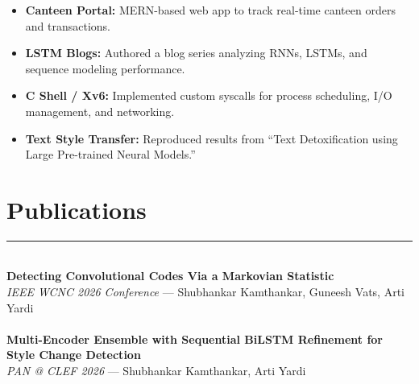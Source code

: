 \documentclass[]{rahulworld-resume}
\begin{document}
\begin{minipage}[t]{0.64\textwidth}
 
\noindent
\hspace{5em}%
\begin{minipage}{0.85\textwidth\vspace{5pt}}
\begin{itemize}
  \item \textbf{Canteen Portal:} MERN-based web app to track real-time canteen orders and transactions.
  \item \textbf{LSTM Blogs:} Authored a blog series analyzing RNNs, LSTMs, and sequence modeling performance.
  \item \textbf{C Shell / Xv6:} Implemented custom syscalls for process scheduling, I/O management, and networking.
  \item \textbf{Text Style Transfer:} Reproduced results from ``Text Detoxification using Large Pre-trained Neural Models.''
\end{itemize}
\end{minipage}

\section{Publications}
\noindent\rule{12.5cm}{0.4pt}

\\
\textbf{Detecting Convolutional Codes Via a Markovian Statistic}\\
\textit{IEEE WCNC 2026 Conference} — Shubhankar Kamthankar, Guneesh Vats, Arti Yardi\\

\vspace{4pt}
\\
\textbf{Multi-Encoder Ensemble with Sequential BiLSTM Refinement for Style Change Detection}\\
\textit{PAN @ CLEF 2026} — Shubhankar Kamthankar, Arti Yardi\\

\end{minipage}
\end{document}
